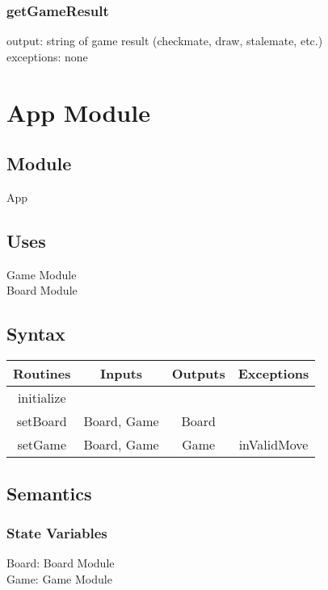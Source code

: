 \documentclass[12pt, titlepage]{article}
\begin{document}
        \subsubsection*{getGameResult}
            output: string of game result (checkmate, draw, stalemate, etc.) \\
            exceptions: none
            

\newpage
\section*{App Module}
    \subsection*{Module}
        App
    
    \subsection*{Uses}
        Game Module \\
        Board Module
    
    \subsection*{Syntax}
        \begin{center}
            \begin{tabular}{|c|c|c|c|} 
                \hline
                Routines & Inputs & Outputs & Exceptions \\
                \hline
                initialize & & &\\
                \hline
                setBoard & Board, Game & Board &  \\ 
                \hline
                setGame & Board, Game & Game & inValidMove \\
                \hline
            \end{tabular}
        \end{center}
    
    \subsection*{Semantics}
        \subsubsection*{State Variables}
            Board: Board Module\\
            Game: Game Module
            
\end{document}
